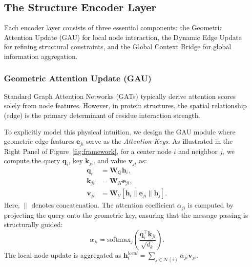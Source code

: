 \documentclass{article}
\theoremstyle{plain}
\theoremstyle{definition}
\theoremstyle{remark}
\begin{document}
{\subsection{The Structure Encoder Layer}\label{sec:encoder}

Each encoder layer consists of three essential components: the Geometric Attention Update (GAU) for local node interaction, the Dynamic Edge Update for refining structural constraints, and the Global Context Bridge for global information aggregation.



\subsubsection{Geometric Attention Update (GAU)}
Standard Graph Attention Networks (GATs) typically derive attention scores solely from node features. However, in protein structures, the spatial relationship (edge) is the primary determinant of residue interaction strength.

To explicitly model this physical intuition, we design the GAU module where geometric edge features $\mathbf{e}_{ji}$ serve as the \textit{Attention Keys}. As illustrated in the Right Panel of Figure~\ref{fig:framework}, for a center node $i$ and neighbor $j$, we compute the query $\mathbf{q}_i$, key $\mathbf{k}_{ji}$, and value $\mathbf{v}_{ji}$ as:
\begin{equation}
\begin{split}
    \mathbf{q}_i &= \mathbf{W}_Q \mathbf{h}_i, \\
    \mathbf{k}_{ji} &= \mathbf{W}_K \mathbf{e}_{ji},  \\
    \mathbf{v}_{ji} &= \mathbf{W}_V [\mathbf{h}_i \parallel \mathbf{e}_{ji} \parallel \mathbf{h}_j].
\end{split}
\end{equation}
Here, $\parallel$ denotes concatenation. The attention coefficient $\alpha_{ji}$ is computed by projecting the query onto the geometric key, ensuring that the message passing is structurally guided:
\begin{equation}
    \alpha_{ji} = \text{softmax}_j \left( \frac{\mathbf{q}_i^\top \mathbf{k}_{ji}}{\sqrt{d_k}} \right).
\end{equation}
The local node update is aggregated as $\mathbf{h}_i^{local} = \sum_{j \in \mathcal{N}(i)} \alpha_{ji} \mathbf{v}_{ji}$. 

}
\end{document}

